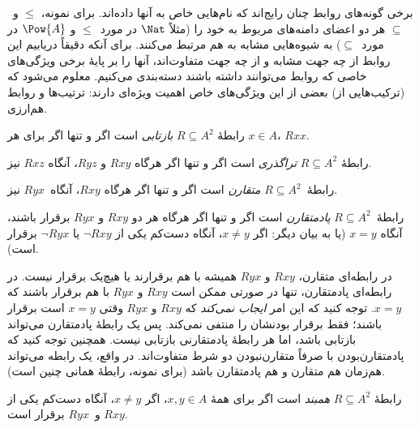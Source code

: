 \documentclass[../../../include/open-logic-section]{subfiles}
\begin{document}

\begin{intro}
برخی گونه‌های روابط چنان رایج‌اند که نام‌هایی خاص به آنها داده‌اند.
برای نمونه، $\le$ و~$\subseteq$ هر دو اعضای دامنه‌های مربوط به خود را
(مثلاً $\Nat$ در مورد~$\le$ و $\Pow{A}$ در مورد~$\subseteq$) به
شیوه‌هایی مشابه به هم مرتبط می‌کنند. برای آنکه دقیقاً دریابیم این روابط
از چه جهت مشابه و از چه جهت متفاوت‌اند، آنها را بر پایهٔ برخی ویژگی‌های
خاصی که روابط می‌توانند داشته باشند دسته‌بندی می‌کنیم. معلوم می‌شود که
(ترکیب‌هایی از) بعضی از این ویژگی‌های خاص اهمیت ویژه‌ای دارند: ترتیب‌ها
و روابط هم‌ارزی.
\end{intro}

\begin{defn}
رابطهٔ $R \subseteq A^2$ \emph{بازتابی} است اگر و تنها اگر برای هر $x \in
A$، $Rxx$.
\end{defn}

\begin{defn}[تراگذری]
رابطهٔ $R \subseteq A^2$ \emph{تراگذری} است اگر و تنها اگر هرگاه $Rxy$
و $Ryz$، آنگاه $Rxz$ نیز.
\end{defn}

\begin{defn}[تقارن]
رابطهٔ~$R \subseteq A^2$ \emph{متقارن} است اگر و تنها اگر هرگاه
$Rxy$، آنگاه~$Ryx$ نیز.
\end{defn}

\begin{defn}[پادتقارنی]
رابطهٔ~$R \subseteq A^2$ \emph{پادمتقارن} است اگر و تنها اگر هرگاه هر دو
$Rxy$ و $Ryx$ برقرار باشند، آنگاه $x=y$ (یا به بیان دیگر: اگر $x\neq y$،
آنگاه دست‌کم یکی از $\lnot Rxy$ یا $\lnot Ryx$ برقرار است).
\end{defn}

\begin{explain}
در رابطه‌ای متقارن، $Rxy$ و $Ryx$ همیشه با هم برقرارند یا هیچ‌یک برقرار
نیست. در رابطه‌ای پادمتقارن، تنها در صورتی ممکن است $Rxy$ و $Ryx$ با هم
برقرار باشند که $x = y$. توجه کنید که این امر \emph{ایجاب نمی‌کند} که
$Rxy$ و $Ryx$ وقتی $x = y$ است برقرار باشند؛ فقط برقرار بودنشان را منتفی
نمی‌کند. پس یک رابطهٔ پادمتقارن می‌تواند بازتابی باشد، اما هر رابطهٔ
پادمتقارنی بازتابی نیست. همچنین توجه کنید که پادمتقارن‌بودن با صرفاً
متقارن‌نبودن دو شرط متفاوت‌اند. در واقع، یک رابطه می‌تواند هم‌زمان هم
متقارن و هم پادمتقارن باشد (برای نمونه، رابطهٔ همانی چنین است).
\end{explain}

\begin{defn}[همبندی]
رابطهٔ $R \subseteq A^2$ \emph{همبند} است اگر برای همهٔ $x,y\in
A$، اگر $x \neq y$، آنگاه دست‌کم یکی از $Rxy$ و~$Ryx$ برقرار است.
\end{defn}
\end{document}
